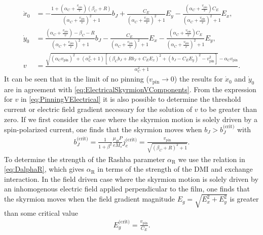 \begin{subequations}
\begin{align}
\dot{x}_0 &= -\frac{1+(\alpha_C+\frac{v_{\textrm{pin}}}{v})(\beta_C+R)}{(\alpha_C+\frac{v_{\textrm{pin}}}{v})^2+1}b_J + \frac{C_E}{(\alpha_C+\frac{v_{\textrm{pin}}}{v})^2+1}E_y - \frac{(\alpha_C+\frac{v_{\textrm{pin}}}{v})C_E}{(\alpha_C+\frac{v_{\textrm{pin}}}{v})^2+1}E_x, \\
\dot{y}_0 &= \frac{(\alpha_C+\frac{v_{\textrm{pin}}}{v})-\beta_C - R}{(\alpha_C+\frac{v_{\textrm{pin}}}{v})^2+1}b_J - \frac{C_E}{(\alpha_C+\frac{v_{\textrm{pin}}}{v})^2+1}E_x - \frac{(\alpha_C+\frac{v_{\textrm{pin}}}{v}) C_E}{(\alpha_C+\frac{v_{\textrm{pin}}}{v})^2+1}E_y, \\
\label{eq:PinningVElectrical}
v &= \frac{\sqrt{(\alpha_Cv_{\textrm{pin}})^2+(\alpha_C^2+1)\left[(\beta_Cb_J+Rb_J+
C_EE_x)^2+(b_J-C_EE_y)^2-v_{\textrm{pin}}^2\right]}-\alpha_Cv_{\textrm{pin}}}{\alpha_C^2+1}.
\end{align}
\end{subequations}
It can be seen that in the limit of no pinning ($v_{\textrm{pin}} \rightarrow 0$) the results for $\dot{x}_0$ and $\dot{y}_0$ are in agreement with \eqref{eq:ElectricalSkyrmionVComponents}. From the expression for $v$ in \eqref{eq:PinningVElectrical} it is also possible to determine the threshold current or electric field gradient necessary for the solution of $v$ to be greater than zero. If we first consider the case where the skyrmion motion is solely driven by a spin-polarized current, one finds that the skyrmion moves when $b_J > b_J^{\textrm{(crit)}}$ with
\begin{align}
b_J^{\textrm{(crit)}} = \frac{1}{1+\beta^2} \frac{\mu_BP}{eM_s}j_e^{\textrm{(crit)}}= \frac{v_{\textrm{pin}}}{\sqrt{(\beta_C+R)^2+1}}.
\end{align}
To determine the strength of the Rashba parameter $\alpha_{\text{R}}$ we use the relation in \eqref{eq:DalphaR}, which gives $\alpha_{\text{R}}$ in terms of the strength of the DMI and exchange interaction. In the field driven case where the skyrmion motion is solely driven by an inhomogenous electric field applied perpendicular to the film, one finds that the skyrmion moves when the field gradient magnitude $E_g = \sqrt{E_x^2+E_y^2}$ is greater than some critical value
\begin{align}
E_g^{\textrm{(crit)}} = \frac{v_{\textrm{pin}}}{C_E}.
\end{align}
